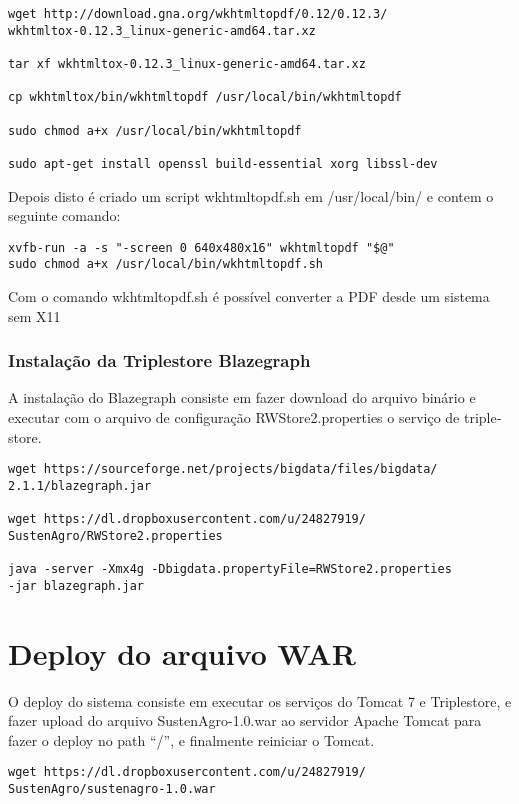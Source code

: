 \begin{lstlisting}
wget http://download.gna.org/wkhtmltopdf/0.12/0.12.3/
wkhtmltox-0.12.3_linux-generic-amd64.tar.xz

tar xf wkhtmltox-0.12.3_linux-generic-amd64.tar.xz

cp wkhtmltox/bin/wkhtmltopdf /usr/local/bin/wkhtmltopdf

sudo chmod a+x /usr/local/bin/wkhtmltopdf

sudo apt-get install openssl build-essential xorg libssl-dev
\end{lstlisting}
Depois disto é criado um \foreignlanguage{english}{script wkhtmltopdf.sh}
em \foreignlanguage{english}{/usr/local/bin/} e contem o seguinte
comando:

\begin{lstlisting}
xvfb-run -a -s "-screen 0 640x480x16" wkhtmltopdf "$@"
sudo chmod a+x /usr/local/bin/wkhtmltopdf.sh 
\end{lstlisting}
Com o comando \foreignlanguage{english}{wkhtmltopdf.sh} é possível
converter a \foreignlanguage{english}{PDF} desde um sistema sem X11

\subsubsection*{Instalação da \foreignlanguage{english}{Triplestore Blazegraph}}

A instalação do \foreignlanguage{english}{Blazegraph} consiste em
fazer download do arquivo binário e executar com o arquivo de configuração
RWStore2.properties o serviço de \foreignlanguage{english}{triplestore}.

\begin{lstlisting}
wget https://sourceforge.net/projects/bigdata/files/bigdata/
2.1.1/blazegraph.jar

wget https://dl.dropboxusercontent.com/u/24827919/
SustenAgro/RWStore2.properties

java -server -Xmx4g -Dbigdata.propertyFile=RWStore2.properties 
-jar blazegraph.jar
\end{lstlisting}
%

\section{Deploy\foreignlanguage{brazil}{ do arquivo }WAR}

%
O \foreignlanguage{english}{deploy} do sistema consiste em executar
os serviços do \foreignlanguage{english}{Tomcat} 7 e \foreignlanguage{english}{Triplestore},
e fazer \foreignlanguage{english}{upload} do arquivo SustenAgro-1.0.war
ao servidor Apache Tomcat para fazer o \foreignlanguage{english}{deploy}
no \foreignlanguage{english}{path} ``/'', e finalmente reiniciar
o \foreignlanguage{english}{Tomcat}.

\begin{lstlisting}
wget https://dl.dropboxusercontent.com/u/24827919/
SustenAgro/sustenagro-1.0.war
\end{lstlisting}
